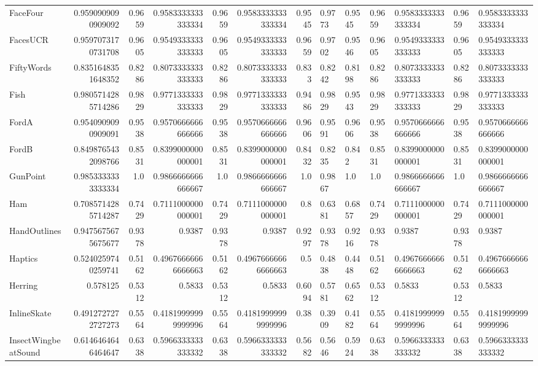 \begin{table}[t]
\begin{tabular}{lrrrrrr}
FaceFour & 0.9590909090909092 & 0.9659 & 0.9583333333333334 & 0.9659 & 0.9583333333333334 & 0.9545 & 0.9773 & 0.9545 & 0.9659 & 0.9583333333333334 & 0.9659 & 0.9583333333333334 \\
FacesUCR & 0.9597073170731708 & 0.9605 & 0.9549333333333333 & 0.9605 & 0.9549333333333333 & 0.9659 & 0.9702 & 0.9546 & 0.9605 & 0.9549333333333333 & 0.9605 & 0.9549333333333333 \\
FiftyWords & 0.8351648351648352 & 0.8286 & 0.8073333333333333 & 0.8286 & 0.8073333333333333 & 0.833 & 0.8242 & 0.8198 & 0.8286 & 0.8073333333333333 & 0.8286 & 0.8073333333333333 \\
Fish & 0.9805714285714286 & 0.9829 & 0.9771333333333333 & 0.9829 & 0.9771333333333333 & 0.9486 & 0.9829 & 0.9543 & 0.9829 & 0.9771333333333333 & 0.9829 & 0.9771333333333333 \\
FordA & 0.9540909090909091 & 0.9538 & 0.9570666666666666 & 0.9538 & 0.9570666666666666 & 0.9606 & 0.9591 & 0.9606 & 0.9538 & 0.9570666666666666 & 0.9538 & 0.9570666666666666 \\
FordB & 0.8498765432098766 & 0.8531 & 0.8399000000000001 & 0.8531 & 0.8399000000000001 & 0.8432 & 0.8235 & 0.842 & 0.8531 & 0.8399000000000001 & 0.8531 & 0.8399000000000001 \\
GunPoint & 0.9853333333333334 & 1.0 & 0.9866666666666667 & 1.0 & 0.9866666666666667 & 1.0 & 0.9867 & 1.0 & 1.0 & 0.9866666666666667 & 1.0 & 0.9866666666666667 \\
Ham & 0.7085714285714287 & 0.7429 & 0.7111000000000001 & 0.7429 & 0.7111000000000001 & 0.8 & 0.6381 & 0.6857 & 0.7429 & 0.7111000000000001 & 0.7429 & 0.7111000000000001 \\
HandOutlines & 0.9475675675675677 & 0.9378 & 0.9387 & 0.9378 & 0.9387 & 0.9297 & 0.9378 & 0.9216 & 0.9378 & 0.9387 & 0.9378 & 0.9387 \\
Haptics & 0.5240259740259741 & 0.5162 & 0.49676666666666663 & 0.5162 & 0.49676666666666663 & 0.5 & 0.4838 & 0.4448 & 0.5162 & 0.49676666666666663 & 0.5162 & 0.49676666666666663 \\
Herring & 0.578125 & 0.5312 & 0.5833 & 0.5312 & 0.5833 & 0.6094 & 0.5781 & 0.6562 & 0.5312 & 0.5833 & 0.5312 & 0.5833 \\
InlineSkate & 0.4912727272727273 & 0.5564 & 0.41819999999999996 & 0.5564 & 0.41819999999999996 & 0.38 & 0.3909 & 0.4182 & 0.5564 & 0.41819999999999996 & 0.5564 & 0.41819999999999996 \\
InsectWingbeatSound & 0.6146464646464647 & 0.6338 & 0.5966333333333332 & 0.6338 & 0.5966333333333332 & 0.5682 & 0.5646 & 0.5924 & 0.6338 & 0.5966333333333332 & 0.6338 & 0.5966333333333332 \\

\end{tabular}
\end{table}
